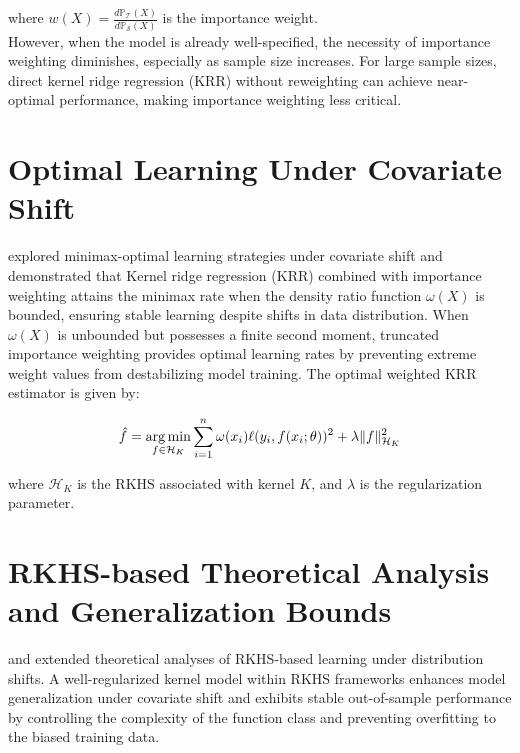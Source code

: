 where $w(X) = \frac{d\mathbb{P}_{\mathcal{T}}(X)}{d\mathbb{P}_{\mathcal{S}}(X)}$ is the importance weight.\\

However, when the model is already well-specified, the necessity of importance weighting diminishes, especially as sample size increases. For large sample sizes, direct kernel ridge regression (KRR) without reweighting can achieve near-optimal performance, making importance weighting less critical.

\section{Optimal Learning Under Covariate Shift}

\citep{ma2022optimally} explored minimax-optimal learning strategies under covariate shift and demonstrated that Kernel ridge regression (KRR) combined with importance weighting attains the minimax rate when the density ratio function $\omega(X)$ is bounded, ensuring stable learning despite shifts in data distribution. When $\omega(X)$ is unbounded but possesses a finite second moment, truncated importance weighting provides optimal learning rates by preventing extreme weight values from destabilizing model training. The optimal weighted KRR estimator is given by:

\begin{equation}
    \hat{f} = \operatorname*{arg\,min}_{f \in \mathcal{H}_K} \sum_{i=1}^n \omega(x_i) \ell(y_i, f(x_i; \theta))^2 + \lambda \lVert f \rVert_{\mathcal{H}_K}^2
    \label{eqn:5.2}
\end{equation}

where $\mathcal{H}_K$ is the RKHS associated with kernel $K$, and $\lambda$ is the regularization parameter.

\section{RKHS-based Theoretical Analysis and Generalization Bounds}

\citep{bach2024learning} and \citep{mohri2018foundations} extended theoretical analyses of RKHS-based learning under distribution shifts. A well-regularized kernel model within RKHS frameworks enhances model generalization under covariate shift and exhibits stable out-of-sample performance by controlling the complexity of the function class and preventing overfitting to the biased training data.\\

